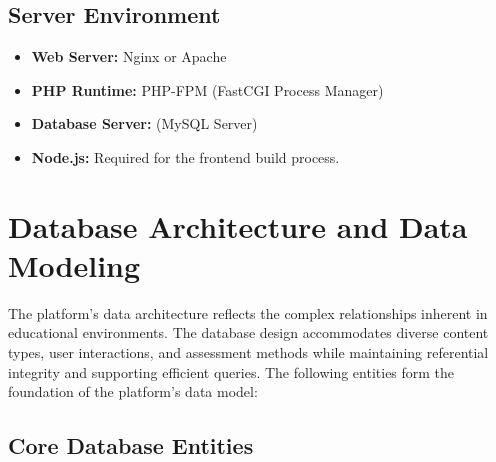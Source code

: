 \documentclass[12pt,a4paper]{article}
\begin{document}
\subsection{Server Environment}
\begin{itemize}
    \item \textbf{Web Server:} Nginx or Apache
    \item \textbf{PHP Runtime:} PHP-FPM (FastCGI Process Manager)
    \item \textbf{Database Server:} (MySQL Server)
    \item \textbf{Node.js:} Required for the frontend build process.
\end{itemize}




\section{Database Architecture and Data Modeling}
\label{sec:database-architecture}

The platform's data architecture reflects the complex relationships inherent in educational environments. The database design accommodates diverse content types, user interactions, and assessment methods while maintaining referential integrity and supporting efficient queries. The following entities form the foundation of the platform's data model:

\subsection{Core Database Entities}
\end{document}
